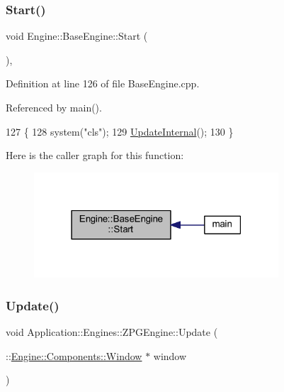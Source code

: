 \subsubsection{\texorpdfstring{Start()}{Start()}}
{\footnotesize\ttfamily void Engine\+::\+Base\+Engine\+::\+Start (\begin{DoxyParamCaption}{ }\end{DoxyParamCaption})\hspace{0.3cm}{\ttfamily [virtual]}, {\ttfamily [inherited]}}



Definition at line 126 of file Base\+Engine.\+cpp.



Referenced by main().


\begin{DoxyCode}
127 \{
128     system(\textcolor{stringliteral}{"cls"});
129     \mbox{\hyperlink{classEngine_1_1BaseEngine_aad3c237ca657b9f22f76fccf7fc7561f}{UpdateInternal}}();
130 \}
\end{DoxyCode}
Here is the caller graph for this function\+:
\nopagebreak
\begin{figure}[H]
\begin{center}
\leavevmode
\includegraphics[width=259pt]{classEngine_1_1BaseEngine_a525fdc7a1da7eecb514ad5763f06be79_icgraph}
\end{center}
\end{figure}
\mbox{\label{classApplication_1_1Engines_1_1ZPGEngine_a44b3d077ad688846aaa40d95ad14f851}} 
\subsubsection{\texorpdfstring{Update()}{Update()}\hspace{0.1cm}{\footnotesize\ttfamily [1/2]}}
{\footnotesize\ttfamily void Application\+::\+Engines\+::\+Z\+P\+G\+Engine\+::\+Update (\begin{DoxyParamCaption}\item[{\+::\mbox{\hyperlink{classEngine_1_1Components_1_1Window}{Engine\+::\+Components\+::\+Window}} $\ast$}]{window }\end{DoxyParamCaption})\hspace{0.3cm}{\ttfamily [override]}}



